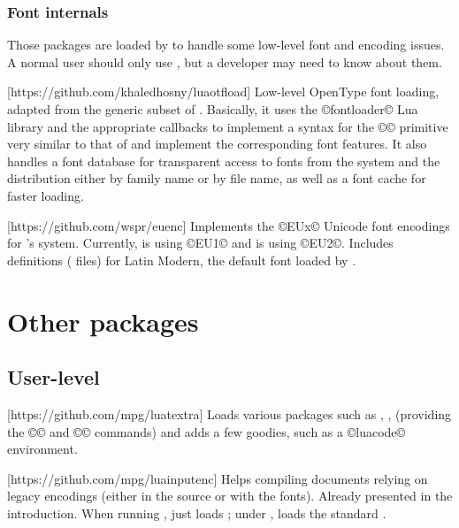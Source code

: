 \documentclass{lltxdoc}
\begin{document}
\subsubsection{Font internals}\label{fontint}

Those packages are loaded by  to handle some low-level font and
encoding issues. A normal user should only use , but a developer
may need to know about them.

[https://github.com/khaledhosny/luaotfload]
Low-level OpenType font loading, adapted from the generic subset of \context.
Basically, it uses the ©fontloader© Lua library and the appropriate callbacks
to implement a syntax for the ©\font© primitive very similar to that of \xetex
and implement the corresponding font features. It also handles a font database
for transparent access to fonts from the system and the \tex distribution
either by family name or by file name, as well as a font cache for faster
loading.

[https://github.com/wspr/euenc]
Implements the ©EUx© Unicode font encodings for \latex's  system.
Currently, \xelatex is using ©EU1© and \luatex is using ©EU2©. Includes
definitions ( files) for Latin Modern, the default font loaded by
.


\section{Other packages}\label{other}

\subsection{User-level}

[https://github.com/mpg/luatextra]
Loads various packages such as , , 
(providing the ©\LuaTeX© and ©\LuaLaTeX© commands) and adds a few goodies,
such as a ©luacode© environment.

[https://github.com/mpg/luainputenc]
Helps compiling documents relying on legacy encodings (either in the source or
with the fonts). Already presented in the introduction. When running \xetex,
just loads ; under \pdftex, loads the standard
.
\end{document}
